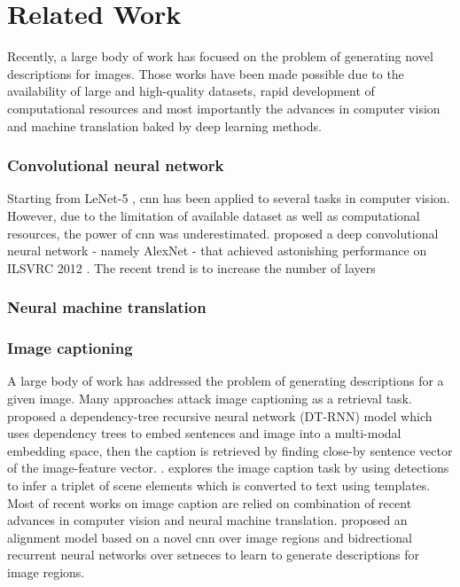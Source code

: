 \section{Related Work}
	Recently, a large body of work has focused on the problem of generating novel descriptions for images. Those works have been made possible due to the availability of large and high-quality datasets, rapid development of computational resources and most importantly the advances in computer vision and machine translation baked by deep learning methods.
	
		\subsubsection{Convolutional neural network} 
		Starting from LeNet-5 \cite{lecun-98}, \gls{cnn} has been applied to several tasks in computer vision. However, due to the limitation of available dataset as well as computational resources, the power of \gls{cnn} was underestimated. \cite{NIPS2012_4824} proposed a deep convolutional neural network - namely AlexNet - that achieved astonishing performance on ILSVRC 2012 \cite{ILSVRC15}. The recent trend is to increase the number of layers \cite{Simonyan14c}
		
		\subsubsection{Neural machine translation}
		
		\subsubsection{Image captioning}
		A large body of work has addressed the problem of generating descriptions for a given image. Many approaches attack image captioning as a retrieval task. \cite{DBLP:journals/tacl/SocherKLMN14} proposed a dependency-tree recursive neural network (DT-RNN) model which uses dependency trees to embed sentences and image into a multi-modal embedding space, then the caption is retrieved by finding close-by sentence vector of the image-feature vector. \cite{Ordonez:2011:im2text} .\cite{Farhadi:2010:PTS:1888089.1888092} explores the image caption task by using detections to infer a triplet of scene elements which is converted to text using templates. Most of recent works on image caption are relied on combination of recent advances in computer vision and neural machine translation. \cite{DBLP:journals/corr/KarpathyF14} proposed an alignment model based on a novel \gls{cnn} \cite{Simonyan14c} over image regions and bidrectional recurrent neural networks over setneces to learn to generate descriptions for image regions. \cite{DBLP:journals/corr/LebretPC15, DBLP:journals/corr/FangGISDDGHMPZZ14, DBLP:journals/corr/DonahueHGRVSD14}